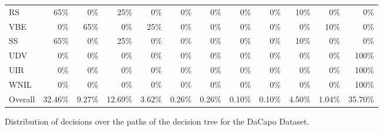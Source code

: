 \begin{figure*}[h]
\begin{tabular}{lrrrrrrrrrrr}
RS    & \cellcolor{lightgreen}65\%  & \cellcolor{lightred}0\%   & \cellcolor{lightgreen}25\%  & \cellcolor{lightred}0\%   & \cellcolor{lightred}0\%   & \cellcolor{lightred}0\%   & \cellcolor{lightred}0\%   & \cellcolor{lightred}0\%   & \cellcolor{lightgreen}10\%  & \cellcolor{lightred}0\%   & \cellcolor{lightred}0\% \\
VBE   & \cellcolor{lightred}0\%   & \cellcolor{lightgreen}65\%  & \cellcolor{lightred}0\%   & \cellcolor{lightgreen}25\%  & \cellcolor{lightred}0\%   & \cellcolor{lightred}0\%   & \cellcolor{lightred}0\%   & \cellcolor{lightred}0\%   & \cellcolor{lightred}0\%   & \cellcolor{lightgreen}10\%  & \cellcolor{lightred}0\% \\
SS    & \cellcolor{lightgreen}65\%  & \cellcolor{lightred}0\%   & \cellcolor{lightgreen}25\%  & \cellcolor{lightred}0\%   & \cellcolor{lightred}0\%   & \cellcolor{lightred}0\%   & \cellcolor{lightred}0\%   & \cellcolor{lightred}0\%   & \cellcolor{lightgreen}10\%  & \cellcolor{lightred}0\%   & \cellcolor{lightred}0\% \\
UDV   & \cellcolor{lightred}0\%   & \cellcolor{lightred}0\%   & \cellcolor{lightred}0\%   & \cellcolor{lightred}0\%   & \cellcolor{lightred}0\%   & \cellcolor{lightred}0\%   & \cellcolor{lightred}0\%   & \cellcolor{lightred}0\%   & \cellcolor{lightred}0\%   & \cellcolor{lightred}0\%   & \cellcolor{lightgreen}100\% \\
UIR   & \cellcolor{lightred}0\%   & \cellcolor{lightred}0\%   & \cellcolor{lightred}0\%   & \cellcolor{lightred}0\%   & \cellcolor{lightred}0\%   & \cellcolor{lightred}0\%   & \cellcolor{lightred}0\%   & \cellcolor{lightred}0\%   & \cellcolor{lightred}0\%   & \cellcolor{lightred}0\%   & \cellcolor{lightgreen}100\% \\
WNIL  & \cellcolor{lightred}0\%   & \cellcolor{lightred}0\%   & \cellcolor{lightred}0\%   & \cellcolor{lightred}0\%   & \cellcolor{lightred}0\%   & \cellcolor{lightred}0\%   & \cellcolor{lightred}0\%   & \cellcolor{lightred}0\%   & \cellcolor{lightred}0\%   & \cellcolor{lightred}0\%   & \cellcolor{lightgreen}100\% \\
\midrule
Overall & \cellcolor{lightgreen}32.46\% & \cellcolor{lightgreen}9.27\% & \cellcolor{lightgreen}12.69\% & \cellcolor{lightblack}3.62\% & \cellcolor{lightblue}0.26\% & \cellcolor{lightblue}0.26\% & \cellcolor{lightblue}0.10\% & \cellcolor{lightblue}0.10\% & \cellcolor{lightblack}4.50\% & \cellcolor{lightblack}1.04\% & \cellcolor{lightgreen}35.70\% \\
\bottomrule
\end{tabular}%
	\caption{Distribution of decisions over the paths of the decision tree for the DaCapo Dataset.}
	\label{fig:paths-dacapo}
\end{figure*}

